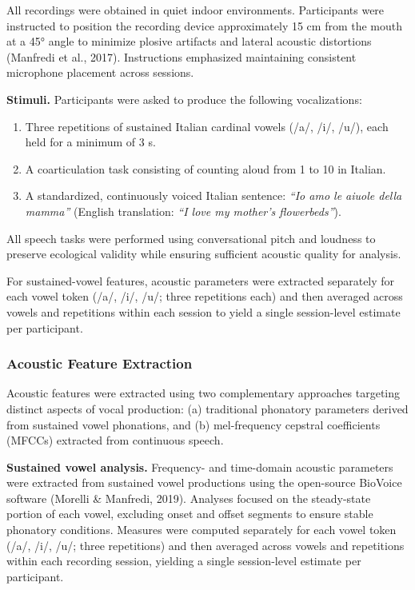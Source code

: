 \documentclass[
  english,
  man]{apa6}
\providecommand{\tightlist}{%
  \setlength{\itemsep}{0pt}\setlength{\parskip}{0pt}}
\begin{document}
All recordings were obtained in quiet indoor environments. Participants were instructed to position the recording device approximately 15 cm from the mouth at a 45° angle to minimize plosive artifacts and lateral acoustic distortions (Manfredi et al., 2017). Instructions emphasized maintaining consistent microphone placement across sessions.

\textbf{Stimuli.} Participants were asked to produce the following vocalizations:

\begin{enumerate}
\def\labelenumi{\arabic{enumi}.}
\tightlist
\item
  Three repetitions of sustained Italian cardinal vowels (/a/, /i/, /u/), each held for a minimum of 3 s.
\item
  A coarticulation task consisting of counting aloud from 1 to 10 in Italian.
\item
  A standardized, continuously voiced Italian sentence: \emph{``Io amo le aiuole della mamma''} (English translation: \emph{``I love my mother's flowerbeds''}).
\end{enumerate}

All speech tasks were performed using conversational pitch and loudness to preserve ecological validity while ensuring sufficient acoustic quality for analysis.

For sustained-vowel features, acoustic parameters were extracted separately for each vowel token (/a/, /i/, /u/; three repetitions each) and then averaged across vowels and repetitions within each session to yield a single session-level estimate per participant.

\subsubsection{Acoustic Feature Extraction}\label{acoustic-feature-extraction}

Acoustic features were extracted using two complementary approaches targeting distinct aspects of vocal production: (a) traditional phonatory parameters derived from sustained vowel phonations, and (b) mel-frequency cepstral coefficients (MFCCs) extracted from continuous speech.

\textbf{Sustained vowel analysis.} Frequency- and time-domain acoustic parameters were extracted from sustained vowel productions using the open-source BioVoice software (Morelli \& Manfredi, 2019). Analyses focused on the steady-state portion of each vowel, excluding onset and offset segments to ensure stable phonatory conditions. Measures were computed separately for each vowel token (/a/, /i/, /u/; three repetitions) and then averaged across vowels and repetitions within each recording session, yielding a single session-level estimate per participant.
\end{document}
